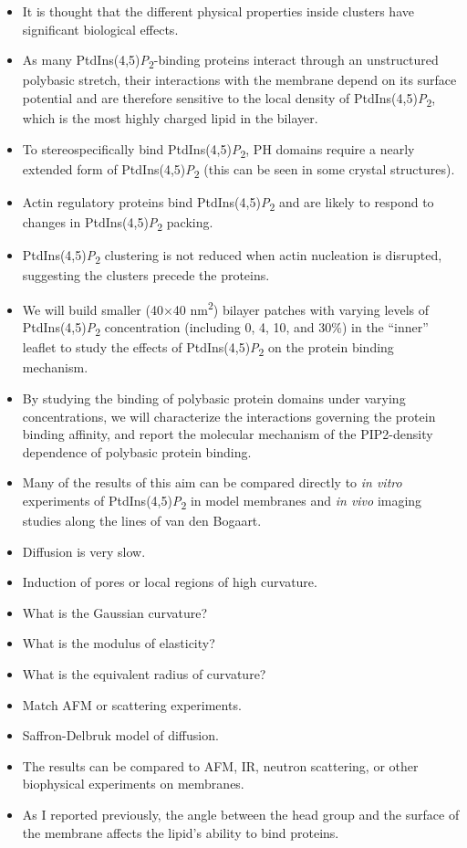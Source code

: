 \documentclass[11pt,notitlepage]{article}
\begin{document}
\begin{itemize}
\item
  It is thought that the different physical properties inside clusters
  have significant biological effects.
\item
  As many PtdIns(4,5)\emph{P}\textsubscript{2}-binding proteins interact
  through an unstructured polybasic stretch, their interactions with the
  membrane depend on its surface potential and are therefore sensitive
  to the local density of PtdIns(4,5)\emph{P}\textsubscript{2}, which is
  the most highly charged lipid in the bilayer.
\item
  To stereospecifically bind PtdIns(4,5)\emph{P}\textsubscript{2}, PH
  domains require a nearly extended form of
  PtdIns(4,5)\emph{P}\textsubscript{2} (this can be seen in some crystal
  structures).
\item
  Actin regulatory proteins bind PtdIns(4,5)\emph{P}\textsubscript{2}
  and are likely to respond to changes in
  PtdIns(4,5)\emph{P}\textsubscript{2} packing.
\item
  PtdIns(4,5)\emph{P}\textsubscript{2} clustering is not reduced when
  actin nucleation is disrupted, suggesting the clusters precede the
  proteins.
\item
  We will build smaller (40×40 nm\textsuperscript{2}) bilayer patches
  with varying levels of PtdIns(4,5)\emph{P}\textsubscript{2}
  concentration (including 0, 4, 10, and 30\%) in the ``inner'' leaflet
  to study the effects of PtdIns(4,5)\emph{P}\textsubscript{2} on the
  protein binding mechanism.
\item
  By studying the binding of polybasic protein domains under varying
  concentrations, we will characterize the interactions governing the
  protein binding affinity, and report the molecular mechanism of the
  PIP2-density dependence of polybasic protein binding.
\item
  Many of the results of this aim can be compared directly to \emph{in
  vitro} experiments of PtdIns(4,5)\emph{P}\textsubscript{2} in model
  membranes and \emph{in vivo} imaging studies along the lines of van
  den Bogaart.
\item
  Diffusion is very slow.
\item
  Induction of pores or local regions of high curvature.
\item
  What is the Gaussian curvature?
\item
  What is the modulus of elasticity?
\item
  What is the equivalent radius of curvature?
\item
  Match AFM or scattering experiments.
\item
  Saffron-Delbruk model of diffusion.
\item
  The results can be compared to AFM, IR, neutron scattering, or other
  biophysical experiments on membranes.
\item
  As I reported previously, the angle between the head group and the
  surface of the membrane affects the lipid's ability to bind proteins.
\end{itemize}
\end{document}
